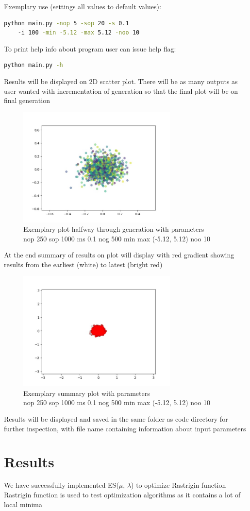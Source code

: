 \documentclass{article}[12pt]
\begin{document}
Exemplary use (settings all values to default values):
\begin{lstlisting}[language=bash]
    python main.py -nop 5 -sop 20 -s 0.1
    -i 100 -min -5.12 -max 5.12 -noo 10
\end{lstlisting}
To print help info about program user can issue help flag:
\begin{lstlisting}[language=bash]
    python main.py -h
\end{lstlisting}
Results will be displayed on 2D scatter plot. There will be as many outputs as user wanted with incrementation of generation so that the final plot will be on final generation \\ 
\begin{figure}[H]
    \caption{Exemplary plot halfway through generation with parameters \\ nop 250 sop 1000 ms 0.1 nog 500 min max (-5.12, 5.12) noo 10 }
    \includegraphics[width=8cm]{example_halfway.jpg}
    \centering
    \end{figure}
At the end summary of results on plot will display with red gradient showing results from the earliest (white) to latest (bright red) \\  
\begin{figure}[H]
    \caption{Exemplary summary plot with parameters\\ nop 250 sop 1000 ms 0.1 nog 500 min max (-5.12, 5.12) noo 10 }
    \includegraphics[width=8cm]{example_summary.jpg}
    \centering
    \end{figure}
Results will be displayed and saved in the same folder as code directory for further inspection, with file name containing information about input parameters 
\section{Results}
We have successfully implemented ES($\mu$, $\lambda$) to optimize Rastrigin function \\ 
Rastrigin function is used to test optimization algorithms as it contains a lot of local minima 
\end{document}
